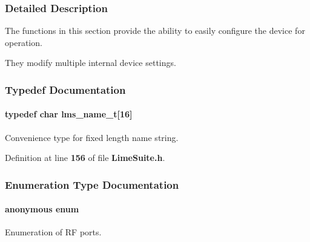 \subsubsection{Detailed Description}
The functions in this section provide the ability to easily configure the device for operation. 

They modify multiple internal device settings. 

\subsubsection{Typedef Documentation}
\paragraph[{lms\+\_\+name\+\_\+t}]{\setlength{\rightskip}{0pt plus 5cm}typedef char lms\+\_\+name\+\_\+t[16]}\label{group__FN__HIGH__LVL_ga6af7301710d83c00a6904f14ed1e4a7d}


Convenience type for fixed length name string. 



Definition at line {\bf 156} of file {\bf Lime\+Suite.\+h}.



\subsubsection{Enumeration Type Documentation}
\paragraph[{anonymous enum}]{\setlength{\rightskip}{0pt plus 5cm}anonymous enum}\label{group__FN__HIGH__LVL_ga06fc87d81c62e9abb8790b6e5713c55b}


Enumeration of RF ports. 

